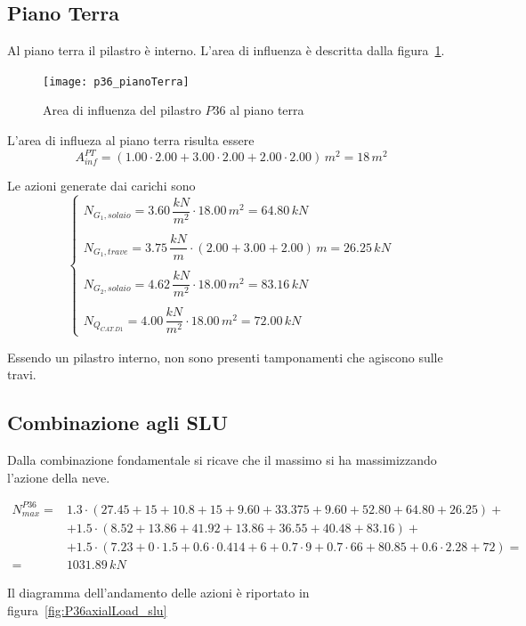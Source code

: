 \subsection{Piano Terra}
Al piano terra il pilastro è interno. L'area di influenza è descritta dalla figura~\ref{fig:p36infAreaPianoTerra}.

\begin{figure}
	\centering
	\texttt{[image: p36\_pianoTerra]}
	\caption{Area di influenza del pilastro $P36$ al piano terra}
	\label{fig:p36infAreaPianoTerra}
\end{figure}

L'area di influeza al piano terra risulta essere
\[
	A_{inf}^{PT} = (1.00\cdot 2.00 + 3.00\cdot2.00 + 2.00\cdot 2.00)\,m^2 = 18\,m^2
\]

Le azioni generate dai carichi sono
\[
	\begin{cases}
		N_{G_1, solaio} = 3.60\,\dfrac{kN}{m^2} \cdot 18.00\,m^2 = 64.80\,kN\\\\
		N_{G_1, trave} = 3.75\,\dfrac{kN}{m}\cdot (2.00 + 3.00 + 2.00)\,m = 26.25\,kN\\\\
		N_{G_2, solaio} = 4.62\,\dfrac{kN}{m^2} \cdot 18.00\,m^2 = 83.16\,kN\\\\
		N_{Q_{CAT.D1}} = 4.00\,\dfrac{kN}{m^2} \cdot 18.00\,m^2 = 72.00\,kN
	\end{cases}
\]

Essendo un pilastro interno, non sono presenti tamponamenti che agiscono sulle travi.

\subsection{Combinazione agli SLU}
Dalla combinazione fondamentale si ricave che il massimo si ha massimizzando l'azione della neve.

\begin{align*}
	N_{max}^{P36} =& 1.3\cdot(27.45 + 15 +10.8 + 15+9.60 + 33.375+9.60+52.80+64.80+26.25)+\\
	&+1.5\cdot(8.52+13.86+41.92+13.86+36.55+40.48+83.16)+\\
	&+1.5\cdot(7.23+0\cdot1.5+0.6\cdot0.414+6+0.7\cdot9+0.7\cdot66+80.85+0.6\cdot2.28+72) =\\
	=& 1031.89\,kN
\end{align*}

Il diagramma dell'andamento delle azioni è riportato in figura~\ref{fig:P36axialLoad_slu}

